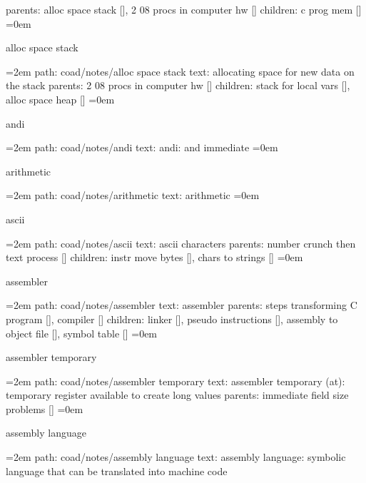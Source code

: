 \smallskip
parents:  alloc space stack [], 2 08 procs in computer hw []
\smallskip
children: c prog mem []
\smallskip
\leftskip=0em
\par\endgroup
\bigskip
{}
alloc space stack
\smallskip
\par\begingroup
\leftskip=2em
path: coad/notes/alloc space stack
\smallskip
text:  allocating space for new data on the stack
\smallskip
parents:  2 08 procs in computer hw []
\smallskip
children: stack for local vars [], alloc space heap []
\smallskip
\leftskip=0em
\par\endgroup
\bigskip
{}
andi
\smallskip
\par\begingroup
\leftskip=2em
path: coad/notes/andi
\smallskip
text:  andi: and immediate
\smallskip
\leftskip=0em
\par\endgroup
\bigskip
{}
arithmetic
\smallskip
\par\begingroup
\leftskip=2em
path: coad/notes/arithmetic
\smallskip
text:  arithmetic
\smallskip
\leftskip=0em
\par\endgroup
\bigskip
{}
ascii
\smallskip
\par\begingroup
\leftskip=2em
path: coad/notes/ascii
\smallskip
text:  ascii characters
\smallskip
parents:  number crunch then text process []
\smallskip
children: instr move bytes [], chars to strings []
\smallskip
\leftskip=0em
\par\endgroup
\bigskip
{}
assembler
\smallskip
\par\begingroup
\leftskip=2em
path: coad/notes/assembler
\smallskip
text:  assembler
\smallskip
parents:  steps transforming C program [], compiler []
\smallskip
children: linker [], pseudo instructions [], assembly to object file [], symbol table []
\smallskip
\leftskip=0em
\par\endgroup
\bigskip
{}
assembler temporary
\smallskip
\par\begingroup
\leftskip=2em
path: coad/notes/assembler temporary
\smallskip
text:  assembler temporary (at): temporary register available to create long values
\smallskip
parents:  immediate field size problems []
\smallskip
\leftskip=0em
\par\endgroup
\bigskip
{}
assembly language
\smallskip
\par\begingroup
\leftskip=2em
path: coad/notes/assembly language
\smallskip
text:  assembly language: symbolic language that can be translated into machine code
